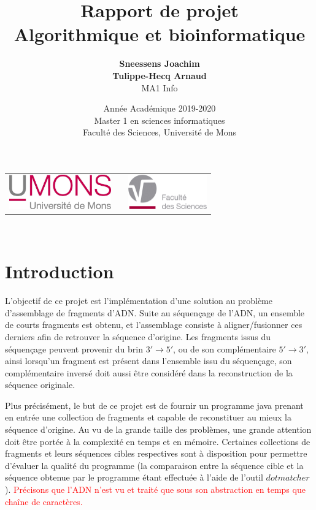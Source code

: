 \documentclass{article}
\title{
{\Huge \textbf{Rapport de projet}\\
Algorithmique et bioinformatique}}
\author{\textbf{Sneessens Joachim}\\\textbf{Tulippe-Hecq Arnaud}\\MA1 Info}
\date{Année Académique 2019-2020\\
Master 1 en sciences informatiques\\
\vspace{1cm}
Faculté des Sciences, Université de Mons}
\begin{document}
\maketitle

\vspace{9cm}

\begin{center}
\begin{tabular}[t]{c c c}
\includegraphics[height=1.5cm]{logoumons.jpg} &
\hspace{1cm} &
\includegraphics[height=1.5cm]{logofs.jpg}
\end{tabular}
\end{center}~\\



\newpage

\section{Introduction}


L'objectif de ce projet est l'implémentation d'une solution au problème d'assemblage de fragments d'ADN. Suite au séquençage de l'ADN, un ensemble de courts fragments est obtenu, et l'assemblage consiste à aligner/fusionner ces derniers afin de retrouver la séquence d'origine. Les fragments issus du séquençage peuvent provenir du brin $3' \to 5'$, ou de son complémentaire $5' \to 3'$, ainsi lorsqu'un fragment est présent dans l'ensemble issu du séquençage, son complémentaire inversé doit aussi être considéré dans la reconstruction de la séquence originale.

Plus précisément, le but de ce projet est de fournir un programme java prenant en entrée une collection de fragments et capable de reconstituer au mieux la séquence d'origine. Au vu de la grande taille des problèmes, une grande attention doit être portée à la complexité en temps et en mémoire. Certaines collections de fragments et leurs séquences cibles respectives sont à disposition pour permettre d'évaluer la qualité du programme (la comparaison entre la séquence cible et la séquence obtenue par le 
programme étant effectuée à l'aide de l'outil $dotmatcher$).
\textcolor{red}{Précisons que l'ADN n'est vu et traité que sous son abstraction en temps que chaîne de caractères.}
\end{document}
